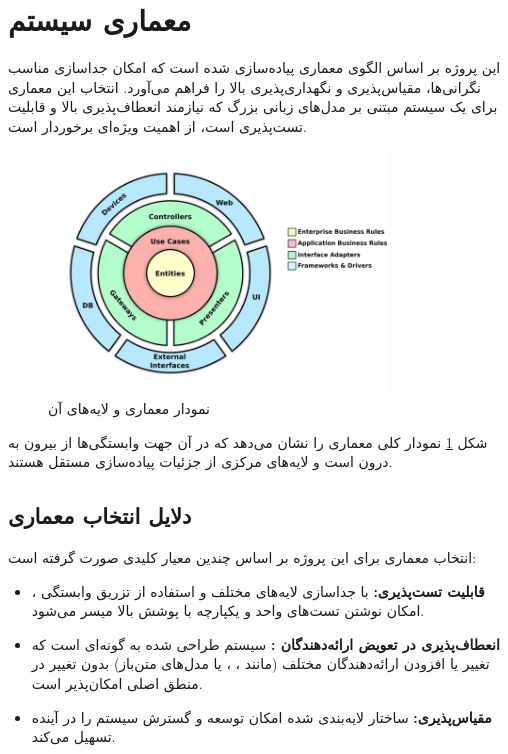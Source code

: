 
\section{معماری سیستم}

این پروژه بر اساس الگوی معماری  پیاده‌سازی شده است که امکان جداسازی مناسب نگرانی‌ها، مقیاس‌پذیری و نگهداری‌پذیری بالا را فراهم می‌آورد. انتخاب این معماری برای یک سیستم مبتنی بر مدل‌های زبانی بزرگ  که نیازمند انعطاف‌پذیری بالا و قابلیت تست‌پذیری است، از اهمیت ویژه‌ای برخوردار است.

\begin{figure}[h]
    \centering
    \includegraphics[width=0.8\textwidth]{clean_architecture.png}
    \caption{نمودار معماری  و لایه‌های آن}
    \label{fig:clean_architecture}
\end{figure}

\noindent
شکل \ref{fig:clean_architecture} نمودار کلی معماری  را نشان می‌دهد که در آن جهت وابستگی‌ها از بیرون به درون است و لایه‌های مرکزی از جزئیات پیاده‌سازی مستقل هستند.

\subsection{دلایل انتخاب معماری }

انتخاب معماری  برای این پروژه بر اساس چندین معیار کلیدی صورت گرفته است:

\begin{itemize}    
    \item \textbf{قابلیت تست‌پذیری:} با جداسازی لایه‌های مختلف و استفاده از تزریق وابستگی ، امکان نوشتن تست‌های واحد و یکپارچه با پوشش بالا میسر می‌شود.
    
    \item \textbf{انعطاف‌پذیری در تعویض ارائه‌دهندگان :} سیستم طراحی شده به گونه‌ای است که تغییر یا افزودن ارائه‌دهندگان مختلف  (مانند ، ، یا مدل‌های متن‌باز) بدون تغییر در منطق اصلی امکان‌پذیر است.
    
    \item \textbf{مقیاس‌پذیری:} ساختار لایه‌بندی شده امکان توسعه و گسترش سیستم را در آینده تسهیل می‌کند.
\end{itemize}

